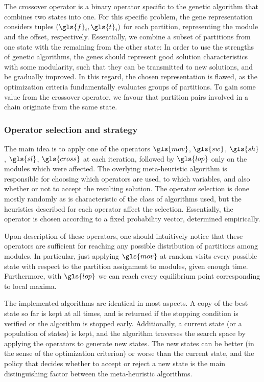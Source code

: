 \documentclass[main.tex]{subfiles}
\begin{document}
The crossover operator is a binary operator specific to the genetic algorithm that combines two states into one.
For this specific problem, the gene representation considers tuples $(\gls{f}_i, \gls{t}_i)$ for each partition, representing the module and the offset, respectively. 
Essentially, we combine a subset of partitions from one state with the remaining from the other state:
In order to use the strengths of genetic algorithms, the genes should represent good solution characteristics with some modularity, such that they can be transmitted to new solutions, and be gradually improved. 
In this regard, the chosen representation is flawed, as the optimization criteria fundamentally evaluates groups of partitions. 
To gain some value from the crossover operator, we favour that partition pairs involved in a chain originate from the same state.

\subsubsection{Operator selection and strategy}

The main idea is to apply one of the operators $\gls{mov}$, $\gls{sw}$, $\gls{sh}$, $\gls{sl}$, $\gls{cross}$ at each iteration, followed by $\gls{lop}$ only on the modules which were affected.
The overlying meta-heuristic algorithm is responsible for choosing which operators are used, to which variables, and also whether or not to accept the resulting solution.
The operator selection is done mostly randomly as is characteristic of the class of algorithms used, but the heuristics described for each operator affect the selection.
Essentially, the operator is chosen according to a fixed probability vector, determined empirically.

Upon description of these operators, one should intuitively notice that these operators are sufficient for reaching any possible distribution of partitions among modules.
In particular, just applying $\gls{mov}$ at random visits every possible state with respect to the partition assignment to modules, given enough time.
Furthermore, with $\gls{lop}$ we can reach every equilibrium point corresponding to local maxima.

The implemented algorithms are identical in most aspects. 
A copy of the best state so far is kept at all times, and is returned if the stopping condition is verified or the algorithm is stopped early.
Additionally, a current state (or a population of states) is kept, and the algorithm traverses the search space by applying the operators to generate new states.
The new states can be better (in the sense of the optimization criterion) or worse than the current state, and the policy that decides whether to accept or reject a new state is the main distinguishing factor between the meta-heuristic algorithms.
\end{document}
